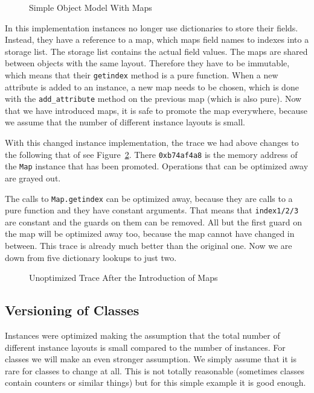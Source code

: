 \documentclass{sig-alternate}
\begin{document}
\begin{figure}

\caption{Simple Object Model With Maps}
\label{fig:maps}
\end{figure}

In this implementation instances no longer use dictionaries to store their fields. Instead, they have a
reference to a map, which maps field names to indexes into a storage list. The
storage list contains the actual field values. The maps are shared between
objects with the same layout. Therefore they have to be immutable, which means
that their \texttt{getindex} method is a pure function. When a new attribute is added
to an instance, a new map needs to be chosen, which is done with the
\texttt{add\_attribute} method on the previous map (which is also pure). Now that we have
introduced maps, it is safe to promote the map everywhere, because we assume
that the number of different instance layouts is small.

With this changed instance implementation, the trace we had above changes to the
following that of see Figure~\ref{fig:trace2}. There \texttt{0xb74af4a8} is the
memory address of the \texttt{Map} instance that has been promoted. Operations
that can be optimized away are grayed out.

The calls to \texttt{Map.getindex} can be optimized away, because they are calls to
a pure function and they have constant arguments. That means that \texttt{index1/2/3}
are constant and the guards on them can be removed. All but the first guard on
the map will be optimized away too, because the map cannot have changed in
between. This trace is already much better than
the original one. Now we are down from five dictionary lookups to just two.

\begin{figure}

\caption{Unoptimized Trace After the Introduction of Maps}
\label{fig:trace2}
\end{figure}





\subsection{Versioning of Classes}

Instances were optimized making the assumption that the total number of
different instance layouts is small compared to the number of instances. For classes we
will make an even stronger assumption. We simply assume that it is rare for
classes to change at all. This is not totally reasonable (sometimes classes contain
counters or similar things) but for this simple example it is good enough.
\end{document}
